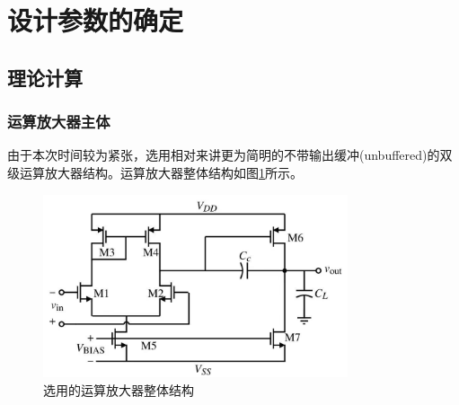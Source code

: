 \documentclass[UTF8]{ctexart}
\numberwithin{figure}{subsection}
\numberwithin{table}{subsection}
\numberwithin{equation}{subsection}
\begin{document}
\section{设计参数的确定}
\subsection{理论计算}
\subsubsection{运算放大器主体}
由于本次时间较为紧张，选用相对来讲更为简明的不带输出缓冲(unbuffered)的双级运算放大器结构。运算放大器整体结构如图\ref{op amp architecture}所示。

\begin{figure}[H]
    \begin{center}
        \includegraphics[width=0.8\textwidth]{op amp architecture.jpg}
    \end{center}
    \caption{选用的运算放大器整体结构}
    \label{op amp architecture}
\end{figure}
\end{document}
